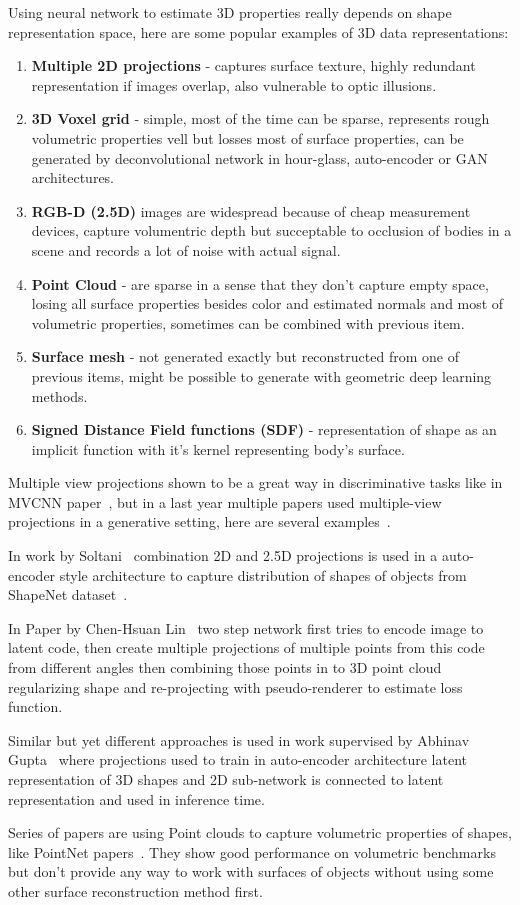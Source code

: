 Using neural network to estimate 3D properties really depends on shape representation space, here are some popular examples of 3D data representations:
\begin{enumerate}
	\item \textbf{Multiple 2D projections} - captures surface texture, highly redundant representation if images overlap, also vulnerable to optic illusions.
	\item \textbf{3D Voxel grid} - simple, most of the time can be sparse, represents rough volumetric properties vell but losses most of surface properties, can be generated by deconvolutional network in hour-glass, auto-encoder or GAN architectures.
	\item \textbf{RGB-D (2.5D)} images are widespread because of cheap measurement devices, capture volumentric depth but succeptable to occlusion of bodies in a scene and records a lot of noise with actual signal.
	\item \textbf{Point Cloud} - are sparse in a sense that they don't capture empty space, losing all surface properties besides color and estimated normals and most of volumetric properties, sometimes can be combined with previous item.
	\item \textbf{Surface mesh} - not generated exactly but reconstructed from one of previous items, might be possible to generate with geometric deep learning methods.
	\item \textbf{Signed Distance Field functions (SDF)} - representation of shape as an implicit function with it's kernel representing body's surface.
\end{enumerate}

Multiple view projections shown to be a great way in discriminative tasks like in MVCNN paper~\cite{su15mvcnn}, but in a last year multiple papers used multiple-view projections in a generative setting, here are several examples~\cite{Soltani_2017_CVPR,girdhar2016learning,lin2017learning,Ulusoy_2017_CVPR,tatarchenko2016multi}.

In work by Soltani~\cite{Soltani_2017_CVPR} combination 2D and 2.5D projections is used in a auto-encoder style architecture to capture distribution of shapes of objects from ShapeNet dataset~\cite{chang2015shapenet}.

In Paper by Chen-Hsuan Lin~\cite{lin2017learning} two step network first tries to encode image to latent code, then create multiple projections of multiple points from this code from different angles then combining those points in to 3D point cloud regularizing shape and re-projecting with pseudo-renderer to estimate loss function.

Similar but yet different approaches is used in work supervised by Abhinav Gupta~\cite{girdhar2016learning} where projections used to train in auto-encoder architecture latent representation of 3D shapes and 2D sub-network is connected to latent representation and used in inference time.

Series of papers are using Point clouds to capture volumetric properties of shapes, like PointNet papers~\cite{qi2016pointnet,qi2017pointnet++}. They show good performance on volumetric benchmarks but don't provide any way to work with surfaces of objects without using some other surface reconstruction method first.